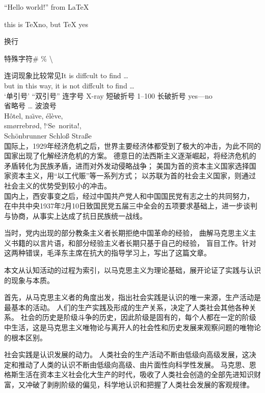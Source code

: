 \documentclass[a4paper, UTF8, onecolumn]{ctexart}
\begin{document}

% 

``Hello world!'' from \LaTeX

this is \TeX no, but \TeX{} yes

换行\par 特殊字符\# \% \textbackslash

连词现象比较常见It is diffcult to find \ldots \\
but in this way, it is not dif{}f{}cult to f{}ind \ldots \\
`单引号' ``双引号''
连字号 X-ray
短破折号 1--100
长破折号 yes---no\\
省略号 \ldots
波浪号 \~\\

H\^otel, na\"\i ve, \'el\`eve,\\
 sm\o rrebr\o d, !`Se\ norita!,\\
 Sch\"onbrunner Schlo\ss{}
 Stra\ss e
\\

国际上，1929年经济危机之后，世界主要经济体都受到了极大的冲击，为此不同的国家出现了化解经济危机的方案。
德意日的法西斯主义逐渐崛起，将经济危机的矛盾转化为民族矛盾，进而对外发动侵略战争；
美国为首的资本主义国家选择国家资本主义，用“以工代赈”等一系列方式；
以苏联为首的社会主义国家，则通过社会主义的优势受到较小的冲击。
\\

国内上，西安事变之后，经过中国共产党人和中国国民党有志之士的共同努力，
在中共中央1937年2月10日致国民党五届三中全会的五项要求基础上，进一步谈判与协商，从事实上达成了抗日民族统一战线。

当时，党内出现的部分教条主义者长期拒绝中国革命的经验，
曲解马克思主义主义书籍的以言片语，和部分经验主义者长期只基于自己的经验，
盲目工作。针对这两种错误，毛泽东主席在抗大的指导学习上，写出了这篇文章。

本文从认知活动的过程为索引，以马克思主义为理论基础，展开论证了实践与认识的现象与本质。

首先，从马克思主义者的角度出发，指出社会实践是认识的唯一来源，生产活动是最基本的活动。
人们的生产实践及形成的生产关系，决定了人类社会其他各种关系。
社会的历史是阶级斗争的历史，因此阶级是固有的，每个人都在一定的阶级中生活，这是马克思主义唯物论与离开人的社会性和历史发展来观察问题的唯物论的根本区别。

社会实践是认识发展的动力。
人类社会的生产活动不断由低级向高级发展，这决定和推动了人类的认识不断由低级向高级、由片面性向科学性发展。
马克思、恩格斯生活在资本主义社会化大生产的时代，吸收了人类社会创造的全部先进知识财富，又冲破了剥削阶级的偏见，科学地认识和把握了人类社会发展的客观规律。
\end{document}
